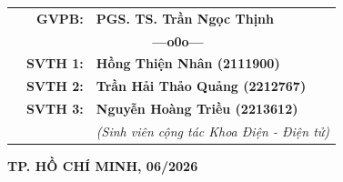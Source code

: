 \begin{titlepage}
\begin{center}
\begin{table}[h]
\begin{tabular}{p{4cm} r l}
                & \textbf{GVPB:} & \textbf{PGS. TS. Trần Ngọc Thịnh} \\
                & \multicolumn{2}{c}{\textbf{---o0o---}} \\
                & \textbf{SVTH 1:} & \textbf{Hồng Thiện Nhân (2111900)} \\
                & \textbf{SVTH 2:} & \textbf{Trần Hải Thảo Quảng (2212767)} \\
                & \textbf{SVTH 3:} & \textbf{Nguyễn Hoàng Triều (2213612)} \\
                & & \textit{(Sinh viên cộng tác Khoa Điện - Điện tử)} \\
            \end{tabular}
        \end{table}

        \vfill

        \textbf{\fontsize{15pt}{18pt}\selectfont TP. HỒ CHÍ MINH, 06/2026}

    \end{center}

    \restoregeometry
\end{titlepage}

